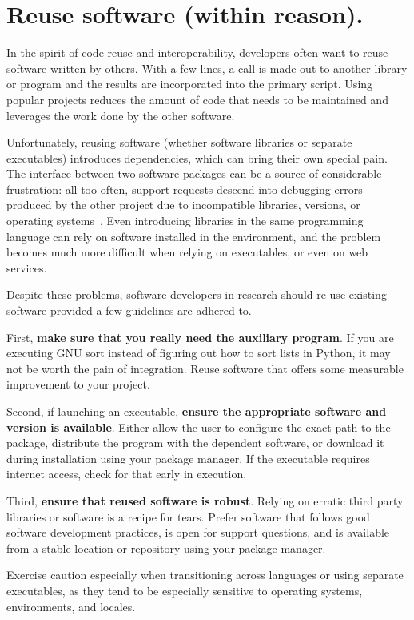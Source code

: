 \documentclass[10pt,letterpaper]{article}
\begin{document}
\section{Reuse software (within reason).}

In the spirit of code reuse and interoperability, developers often want
to reuse software written by others. 
With a few lines, a call
is made out to another library or program and the results are incorporated into the
primary script. Using popular projects reduces the amount of code that
needs to be maintained and leverages the work done by the other software.

Unfortunately, reusing software (whether software libraries or separate executables)
introduces dependencies, which can
bring their own special pain. The interface between two software
packages can be a source of considerable frustration: all too
often, support requests descend into debugging errors produced by the
other project due to incompatible libraries, versions, or operating
systems~\cite{brown2013}. Even introducing libraries in the same programming
language can rely on software installed in the environment, and the problem
becomes much more difficult when relying on executables, or even on web
services.

Despite these problems, software developers in research should
re-use existing software provided a few guidelines are adhered to.

First, 
\textbf{make sure that you really need the auxiliary program}. If you are
executing GNU sort instead of figuring out how to sort lists in Python,
it may not be worth the pain of integration. Reuse software that offers some
measurable improvement to your project.

Second, if launching an executable, \textbf{ensure the appropriate software and version is available}.
Either allow the user to
configure the exact path to the package, distribute the program with the
dependent software, or download it during installation using your
package manager. If the executable requires internet access, check for that
early in execution.

Third, \textbf{ensure that reused software is robust}. Relying on erratic third
party libraries or software is a recipe for tears. Prefer software that follows
good software development practices, is open for support questions, and is
available from a stable location or repository using your package manager.

Exercise caution especially when transitioning across languages or using
separate executables, as they tend to be especially sensitive to operating
systems, environments, and locales. 
\end{document}
